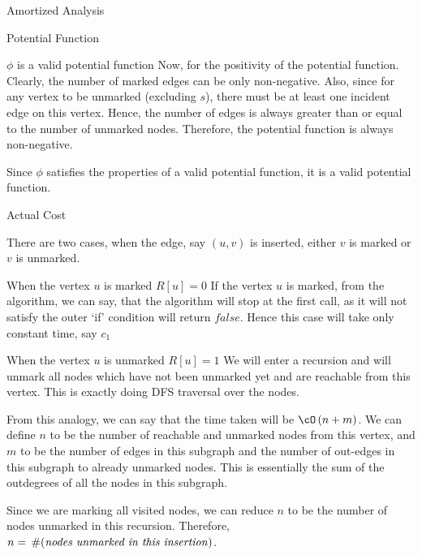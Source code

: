 \documentclass{article}
\begin{document}
\begin{question}
\begin{qsection}{Amortized Analysis}
\begin{qsubsection}{Potential Function}
\begin{qproof}{$\phi$ is a valid potential function}
                Now, for the positivity of the potential function. Clearly, the number of marked edges can be only non-negative. Also, since for any vertex to be unmarked (excluding $s$), there must be at least one incident edge on this vertex. Hence, the number of edges is always greater than or equal to the number of unmarked nodes. Therefore, the potential function is always non-negative.

            \end{qproof}

            Since $\phi$ satisfies the properties of a valid potential function, it is a valid potential function.

        \end{qsubsection}

        \clearpage

        \begin{qsubsection}{Actual Cost}

            There are two cases, when the edge, say $(u, v)$ is inserted, either $v$ is marked or $v$ is unmarked.

            \begin{qcase}{1}{When the vertex $u$ is marked  $R[u] = 0$}
                If the vertex $u$ is marked, from the algorithm, we can say, that the algorithm will stop at the first call, as it will not satisfy the outer `if' condition will return $false$. Hence this case will take only constant time, say $c_1$
            \end{qcase}

            \begin{qcase}{2}{When the vertex $u$ is unmarked  $R[u] = 1$}
                We will enter a recursion and will unmark all nodes which have not been unmarked yet and are reachable from this vertex. This is exactly doing DFS traversal over the nodes. \br%

                From this analogy, we can say that the time taken will be $\bigO{n + m}$. We can define $n$ to be the number of reachable and unmarked nodes from this vertex, and $m$ to be the number of edges in this subgraph and the number of out-edges in this subgraph to already unmarked nodes. This is essentially the sum of the outdegrees of all the nodes in this subgraph. \br%

                Since we are marking all visited nodes, we can reduce $n$ to be the number of nodes unmarked in this recursion. Therefore, $n = \,\#(\text{\textit{nodes unmarked in this insertion}})$. \br%


\end{qcase}
\end{qsubsection}
\end{qsection}
\end{question}
\end{document}
